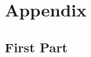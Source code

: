 \section*{Appendix}
\renewcommand{\thesubsection}{\Alph{subsection}}

\subsection{First Part}
\label{appendix: appendix1}


% 
